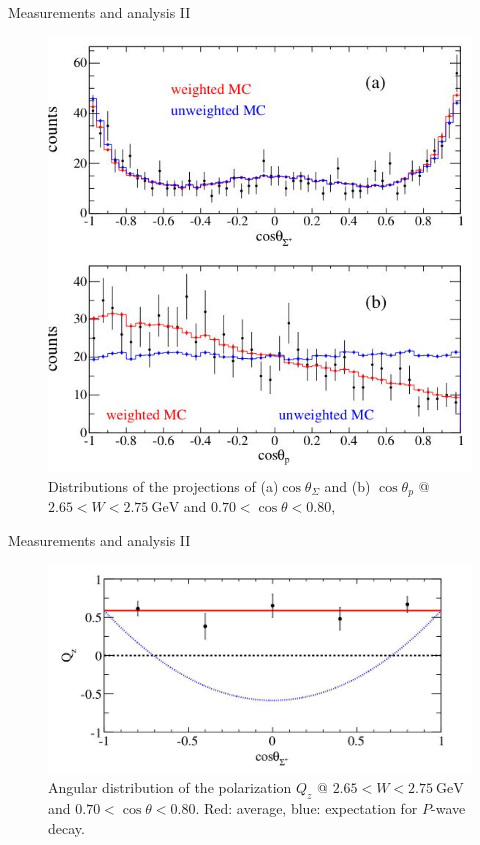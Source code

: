 \documentclass[11pt,aspectratio=1610,dvipsnames]{beamer}
\begin{document}
\begin{frame}{Measurements and analysis II}
		\begin{figure}
			\centering
			\includegraphics[width=.5\linewidth]{angular_dist}
			\caption*{Distributions of the projections of (a)$\cos\theta_\Sigma$ and (b) $\cos\theta_p$ @ $2.65<W<\SI{2.75}{\giga\eV}$ and $0.70<\cos\theta<0.80$,  \citet{spinparity}}
		\end{figure}

\end{frame}
\begin{frame}{Measurements and analysis II}
	\begin{figure}
		\centering
		\includegraphics[width=\linewidth]{angular_pol}
		\caption*{Angular distribution of the polarization $Q_z$ @ $2.65<W<\SI{2.75}{\giga\eV}$ and $0.70<\cos\theta<0.80$. Red: average, blue: expectation for $P$-wave decay.  \citet{spinparity}}
	\end{figure}
	
\end{frame}
\end{document}

